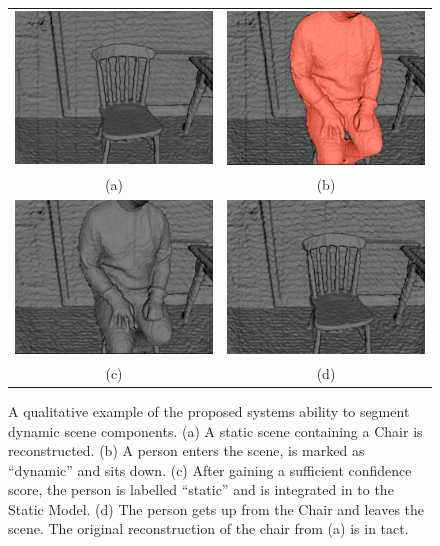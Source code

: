 \begin{figure}[ht]
  \label{fig:moseg_qualitative_chair}
  \centering
  \begin{tabular}{cc}
    \includegraphics[height=.25\linewidth]{figures/moseg/chair0.png} &
    \includegraphics[height=.25\linewidth]{figures/moseg/chair1.png} \\
    (a) & (b) \\
    \includegraphics[height=.25\linewidth]{figures/moseg/chair2.png} &
    \includegraphics[height=.25\linewidth]{figures/moseg/chair3.png} \\
    (c) & (d)
  \end{tabular}
  \caption{A qualitative example of the proposed systems ability to segment
    dynamic scene components.
    (a) A static scene containing a Chair is reconstructed.
    (b) A person enters the scene, is marked as ``dynamic'' and sits down.
    (c) After gaining a sufficient confidence score, the person is labelled
    ``static'' and is integrated in to the Static Model.
    (d) The person gets up from the Chair and leaves the scene. The original
    reconstruction of the chair from (a) is in tact.}
\end{figure}

